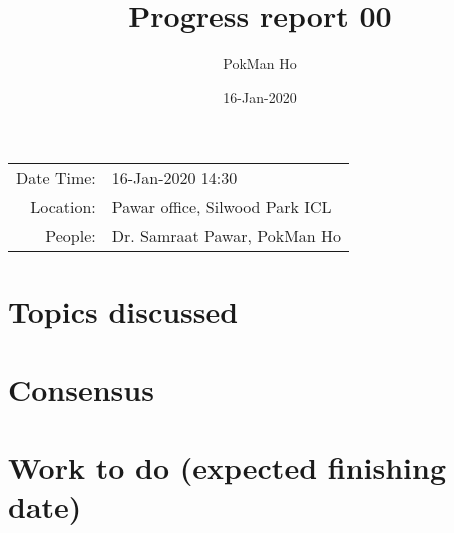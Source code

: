 \documentclass[a4paper,11pt]{article}
\title{Progress report 00}
\author{PokMan Ho}
\date{16-Jan-2020}
\begin{document}
    \maketitle
    
    \begin{tabular}{rl}
        Date Time: & 16-Jan-2020 14:30 \\
        Location: & Pawar office, Silwood Park ICL \\
        People: & Dr. Samraat Pawar, PokMan Ho \\
    \end{tabular}
    \section{Topics discussed}
    \section{Consensus}
    \section{Work to do (expected finishing date)}
\end{document}
